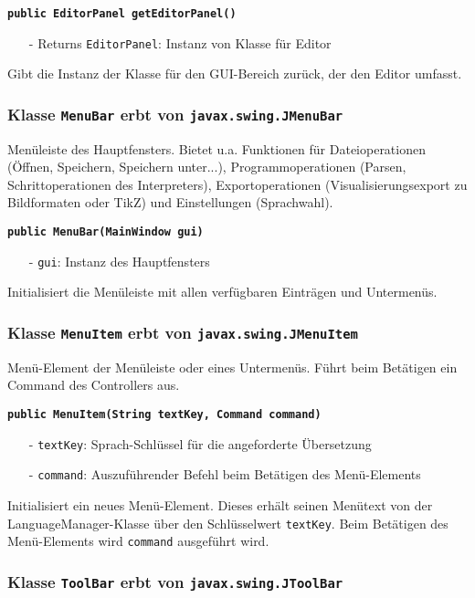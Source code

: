 \documentclass[parskip=full,11pt,twoside]{scrartcl}
\begin{document}
\textbf{\texttt{public EditorPanel getEditorPanel()}}
\begin{itemize}[noitemsep]
	\item[-] Returns \texttt{EditorPanel}: Instanz von Klasse für Editor
\end{itemize}
Gibt die Instanz der Klasse für den GUI-Bereich zurück, der den Editor umfasst.

\subsubsection{Klasse \texttt{MenuBar} erbt von \texttt{javax.swing.JMenuBar}}

Menüleiste des Hauptfensters. Bietet u.a. Funktionen für Dateioperationen (Öffnen, Speichern, Speichern unter...), Programmoperationen (Parsen, Schrittoperationen des Interpreters), Exportoperationen (Visualisierungsexport zu Bildformaten oder TikZ) und Einstellungen (Sprachwahl).

\textbf{\texttt{public MenuBar(MainWindow gui)}}
\begin{itemize}[noitemsep]
	\item[-] \texttt{gui}: Instanz des Hauptfensters
\end{itemize}
Initialisiert die Menüleiste mit allen verfügbaren Einträgen und Untermenüs.

\subsubsection{Klasse \texttt{MenuItem} erbt von \texttt{javax.swing.JMenuItem}}

Menü-Element der Menüleiste oder eines Untermenüs. Führt beim Betätigen ein Command des Controllers aus.

\textbf{\texttt{public MenuItem(String textKey, Command command)}}
\begin{itemize}[noitemsep]
	\item[-] \texttt{textKey}: Sprach-Schlüssel für die angeforderte Übersetzung
	\item[-] \texttt{command}: Auszuführender Befehl beim Betätigen des Menü-Elements
\end{itemize}
Initialisiert ein neues Menü-Element. Dieses erhält seinen Menütext von der LanguageManager-Klasse über den Schlüsselwert \texttt{textKey}. Beim Betätigen des Menü-Elements wird \texttt{command} ausgeführt wird.

\subsubsection{Klasse \texttt{ToolBar} erbt von \texttt{javax.swing.JToolBar}}
\end{document}

